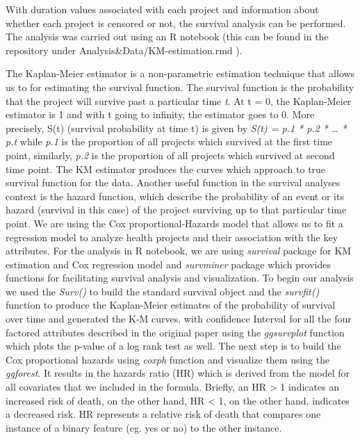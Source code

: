 \documentclass[acmconf]{acmart}
\begin{document}
With duration values associated with each project and information about whether each project is censored or not, the survival analysis can be performed.
The analysis was carried out using an R notebook (this can be found in the repository under Analysis\&Data/KM-estimation.rmd ).


The Kaplan-Meier estimator is a non-parametric estimation technique that allows us to for estimating the survival function. 
The survival function is the probability that the project will survive past a particular time \textit{t}.  
At t = 0, the Kaplan-Meier estimator is 1 and with t going to infinity, the estimator goes to 0.
More precisely, S(t) (survival probability at time t) is given by  \textit{S(t) = p.1 * p.2 * … * p.t} while \textit{p.1} is the proportion of all projects which survived at the first time point, similarly, \textit{p.2} is the proportion of all projects which survived at second time point. 
The KM estimator produces the curves which approach to true survival function for the data. 
Another useful function in the survival analyses context is the hazard function, which describe the probability of an event or its hazard (survival in this case) of the project surviving up to that particular time point. 
We are using the Cox proportional-Hazards model that allows us to fit a regression model to analyze health projects and their association with the key attributes. 
For the analysis in R notebook, we are using \textit{survival} package for KM estimation and Cox regression model and \textit{survminer} package which provides functions for facilitating survival analysis and visualization. 
To begin our analysis we used the \textit{Surv()} to build the standard survival object and the \textit{survfit()} function to produce the Kaplan-Meier estimates of the probability of survival over time and generated the K-M curves, with confidence Interval for all the four factored attributes described in the original paper using the \textit{ggsurvplot } function which plots the p-value of a log rank test as well. 
The next step is to build the Cox proportional hazards using \textit{coxph} function and visualize them using the \textit{ggforest}. 
It results in the hazards ratio (HR) which is derived from the model for all covariates that we included in the formula. 
Briefly, an HR > 1 indicates an increased risk of death, on the other hand, HR < 1, on the other hand, indicates a decreased risk. 
HR represents a relative risk of death that compares one instance of a binary feature (eg. yes or no) to the other instance.
\end{document}
